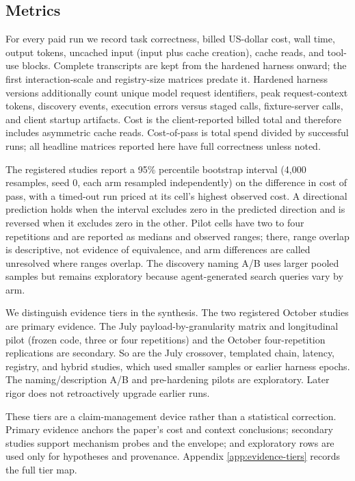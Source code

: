 \documentclass[10pt,twocolumn]{article}
\begin{document}
\subsection{Metrics}

For every paid run we record task correctness, billed US-dollar cost, wall
time, output tokens, uncached input (input plus cache creation), cache reads,
and tool-use blocks.  Complete transcripts are kept from the hardened harness
onward; the first interaction-scale and registry-size matrices predate it.  Hardened
harness versions additionally count unique model request identifiers, peak
request-context tokens, discovery events, execution errors versus staged
calls, fixture-server calls, and client startup artifacts.  Cost is the
client-reported billed total and therefore includes asymmetric cache reads.
Cost-of-pass is total spend divided by successful runs; all headline matrices
reported here have full correctness unless noted.

The registered studies report a 95\% percentile bootstrap interval (4,000
resamples, seed 0, each arm resampled independently) on the difference in
cost of pass, with a timed-out run priced at its cell's highest observed cost.
A directional prediction holds when the interval excludes zero in the
predicted direction and is reversed when it excludes zero in the other.
Pilot cells have two to four repetitions and are reported as medians and
observed ranges; there, range overlap is descriptive, not evidence of
equivalence, and arm differences are called unresolved where ranges
overlap.  The discovery naming A/B uses
larger pooled samples but remains exploratory because agent-generated search
queries vary by arm.

We distinguish evidence tiers in the synthesis.  The two registered October
studies are primary evidence.  The July payload-by-granularity matrix and
longitudinal pilot (frozen code, three or four repetitions) and the October
four-repetition replications are secondary.  So are the July crossover,
templated chain, latency, registry, and hybrid studies, which used smaller
samples or earlier harness epochs.  The naming/description A/B and
pre-hardening pilots are exploratory.  Later rigor does not retroactively
upgrade earlier runs.

These tiers are a claim-management device rather than a statistical
correction.  Primary evidence anchors the paper's cost and context
conclusions; secondary studies support mechanism probes and the envelope; and
exploratory rows are used only for hypotheses and provenance.  Appendix
\ref{app:evidence-tiers} records the full tier map.
\end{document}

